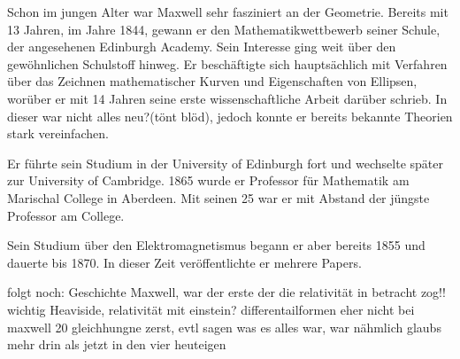 Schon im jungen Alter war Maxwell sehr fasziniert an der Geometrie. Bereits mit 13 Jahren, im Jahre 1844, gewann er den Mathematikwettbewerb seiner Schule, der angesehenen Edinburgh Academy.
Sein Interesse ging weit über den gewöhnlichen Schulstoff hinweg.
Er beschäftigte sich hauptsächlich mit Verfahren über das Zeichnen mathematischer Kurven und Eigenschaften von Ellipsen, worüber er mit 14 Jahren seine erste wissenschaftliche Arbeit darüber schrieb.
In dieser war nicht alles neu?(tönt blöd), jedoch konnte er bereits bekannte Theorien stark vereinfachen.

Er führte sein Studium in der University of Edinburgh fort und wechselte später zur University of Cambridge.
1865 wurde er Professor für Mathematik am Marischal College in Aberdeen.
Mit seinen 25 war er mit Abstand der jüngste Professor am College.%

Sein Studium über den Elektromagnetismus begann er aber bereits 1855 und dauerte bis 1870. In dieser Zeit veröffentlichte er mehrere Papers.

 



folgt noch: Geschichte Maxwell, war der erste der die relativität in betracht zog!! wichtig
Heaviside,
relativität mit einstein?
differentailformen eher nicht
bei maxwell 20 gleichhungne zerst, evtl sagen was es alles war, war nähmlich glaubs mehr drin als jetzt in den vier heuteigen




